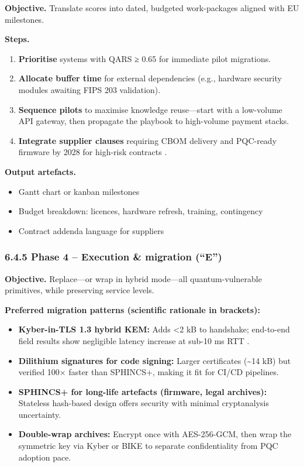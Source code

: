 \documentclass[
  english,
]{article}
\providecommand{\tightlist}{%
  \setlength{\itemsep}{0pt}\setlength{\parskip}{0pt}}
\begin{document}
\textbf{Objective.} Translate scores into dated, budgeted work-packages
aligned with EU milestones.

\textbf{Steps.}

\begin{enumerate}
\def\labelenumi{\arabic{enumi}.}
\tightlist
\item
  \textbf{Prioritise} systems with QARS ≥ 0.65 for immediate pilot
  migrations.
\item
  \textbf{Allocate buffer time} for external dependencies (e.g.,
  hardware security modules awaiting FIPS 203 validation).
\item
  \textbf{Sequence pilots} to maximise knowledge reuse---start with a
  low-volume API gateway, then propagate the playbook to high-volume
  payment stacks.
\item
  \textbf{Integrate supplier clauses} requiring CBOM delivery and
  PQC-ready firmware by 2028 for high-risk contracts .
\end{enumerate}

\textbf{Output artefacts.}

\begin{itemize}
\tightlist
\item
  Gantt chart or kanban milestones
\item
  Budget breakdown: licences, hardware refresh, training, contingency
\item
  Contract addenda language for suppliers
\end{itemize}

\subsubsection{6.4.5 Phase 4 -- Execution \& migration
(``E'')}\label{phase-4-execution-migration-e}

\textbf{Objective.} Replace---or wrap in hybrid mode---all
quantum-vulnerable primitives, while preserving service levels.

\textbf{Preferred migration patterns (scientific rationale in
brackets):}

\begin{itemize}
\tightlist
\item
  \textbf{Kyber-in-TLS 1.3 hybrid KEM:} Adds \textless2 kB to handshake;
  end-to-end field results show negligible latency increase at sub-10 ms
  RTT .
\item
  \textbf{Dilithium signatures for code signing:} Larger certificates
  (\textasciitilde14 kB) but verified 100× faster than SPHINCS+, making
  it fit for CI/CD pipelines.
\item
  \textbf{SPHINCS+ for long-life artefacts (firmware, legal archives):}
  Stateless hash-based design offers security with minimal cryptanalysis
  uncertainty.
\item
  \textbf{Double-wrap archives:} Encrypt once with AES-256-GCM, then
  wrap the symmetric key via Kyber or BIKE to separate confidentiality
  from PQC adoption pace.
\end{itemize}
\end{document}
